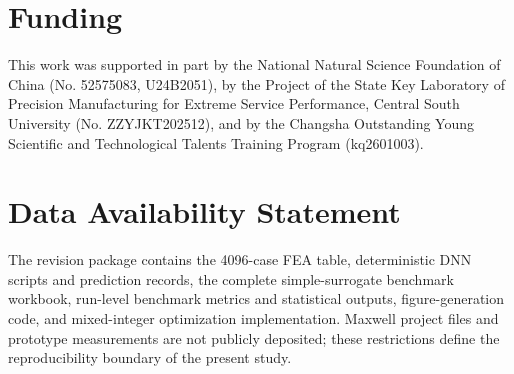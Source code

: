 \section*{Funding}
This work was supported in part by the National Natural Science Foundation of China (No. 52575083, U24B2051), by the Project of the State Key Laboratory of Precision Manufacturing for Extreme Service Performance, Central South University (No. ZZYJKT202512), and by the Changsha Outstanding Young Scientific and Technological Talents Training Program (kq2601003).
\section*{Data Availability Statement}
The revision package contains the 4096-case FEA table, deterministic DNN scripts and prediction records, the complete simple-surrogate benchmark workbook, run-level benchmark metrics and statistical outputs, figure-generation code, and mixed-integer optimization implementation. Maxwell project files and prototype measurements are not publicly deposited; these restrictions define the reproducibility boundary of the present study.






